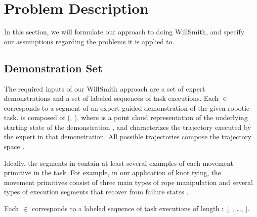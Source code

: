 \section{Problem Description}
\label{sec:formulation}
%

In this section, we will formulate our approach to doing WillSmith, and
specify our assumptions regarding the problems it is applied to.

\subsection{Demonstration Set}

The required inputs of our WillSmith approach are a set \demoset{}
of expert demonstrations and a set  of labeled sequences of
task executions.
Each \demovar{} $\in$ \demoset{} corresponds to a segment
of an expert-guided demonstration of the given robotic task.
\demovar{} is composed of (, ),
where  is a point cloud representation of the underlying
starting state of the demonstration \demovar{}, and  characterizes
the trajectory executed by the expert in that demonstration. All possible
trajectories compose the trajectory space \trajset{}.

Ideally, the segments in \demoset{} contain at least several examples
of each movement primitive in the task.
For example, in our application of knot tying, the movement primitives
consist of three main types of rope manipulation and several types of
execution segments that recover from failure states \cite{Schulmanetal_ISRR2013}.

Each  $\in$  corresponds to a labeled sequence of
task executions of length : [, , \ldots,
]. 

